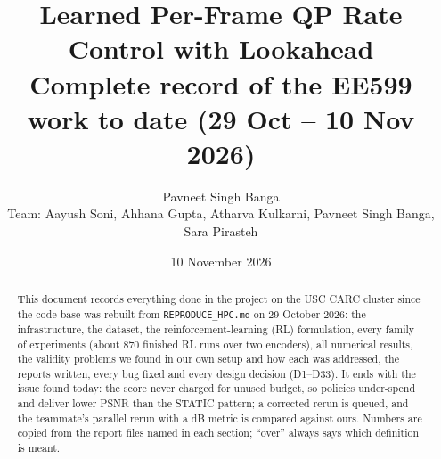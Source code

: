 \documentclass[10pt,a4paper]{article}
\title{\textbf{Learned Per-Frame QP Rate Control with Lookahead}\\[2pt]\large Complete record of the EE599 work to date (29 Oct -- 10 Nov 2026)}
\author{Pavneet Singh Banga\\\small Team: Aayush Soni, Ahhana Gupta, Atharva Kulkarni, Pavneet Singh Banga, Sara Pirasteh}
\date{10 November 2026}
\newcommand{\code}[1]{\texttt{\small #1}}
\begin{document}
\maketitle
\begin{abstract}\noindent
This document records everything done in the project on the USC CARC cluster since the code base was rebuilt from
\code{REPRODUCE\_HPC.md} on 29 October 2026: the infrastructure, the dataset, the reinforcement-learning (RL) formulation,
every family of experiments (about 870 finished RL runs over two encoders), all numerical results, the validity problems
we found in our own setup and how each was addressed, the reports written, every bug fixed and every design decision
(D1--D33). It ends with the issue found today: the score never charged for unused budget, so policies under-spend and
deliver lower PSNR than the STATIC pattern; a corrected rerun is queued, and the teammate's parallel rerun with a dB
metric is compared against ours. Numbers are copied from the report files named in each section; ``over'' always
says which definition is meant.
\end{abstract}
\tableofcontents
\newpage

\end{document}
